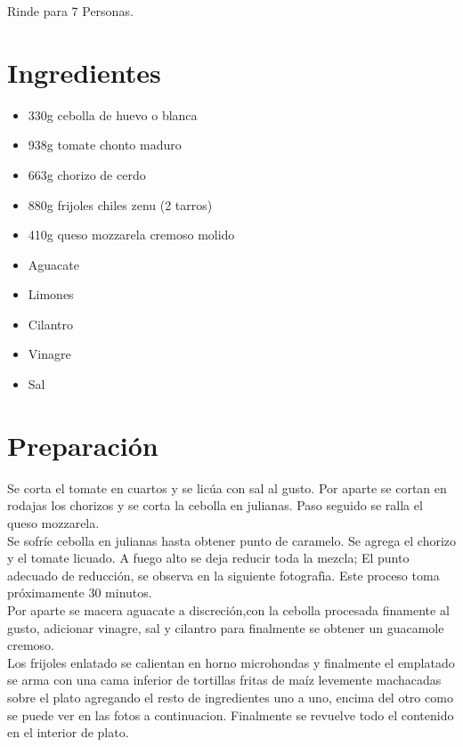 Rinde para 7 Personas.
\section*{Ingredientes}
\begin{itemize}
\setlength{\itemsep}{0pt}
\setlength{\parsep}{0pt} \setlength{\parskip}{0pt}
\item 330g cebolla de huevo o blanca
\item 938g tomate chonto maduro
\item 663g chorizo de cerdo
\item 880g frijoles chiles zenu (2 tarros)
\item 410g queso mozzarela cremoso molido
\item Aguacate
\item Limones
\item Cilantro
\item Vinagre
\item Sal
\end{itemize}
\section*{Preparación}
Se corta el tomate en cuartos y se licúa con sal al gusto. Por aparte se cortan en rodajas los chorizos y se corta la cebolla en julianas. Paso seguido se ralla el queso mozzarela.\\

Se sofríe cebolla en julianas hasta obtener punto de caramelo. Se agrega el chorizo y el tomate licuado. A fuego alto se deja reducir toda la mezcla; El punto adecuado de reducción, se observa en la siguiente fotografìa. Este proceso toma próximamente 30 minutos.\\

Por aparte se macera aguacate a discreción,con la cebolla procesada finamente al gusto, adicionar vinagre, sal y cilantro para finalmente se obtener un guacamole cremoso.\\

Los frijoles enlatado se calientan en horno microhondas y finalmente el emplatado se arma con una cama inferior de tortillas fritas de maíz levemente machacadas sobre el plato agregando el resto de ingredientes uno a uno, encima del otro como se puede ver en las fotos a continuacion. Finalmente se revuelve todo el contenido en el interior de plato.